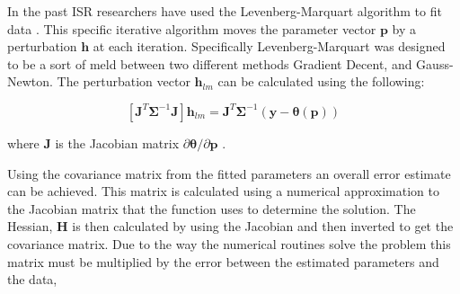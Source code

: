 \documentclass[draft,ras]{agutex}
\begin{document}
\begin{article}
%
%






In the past ISR researchers have used the Levenberg-Marquart algorithm to fit data \citep{nikoukar2008}.  This specific iterative algorithm moves the parameter vector $\mathbf{p}$ by a perturbation $\mathbf{h}$ at each iteration\citep{gavin:2013}.  Specifically Levenberg-Marquart was designed to be a sort of meld between two different methods Gradient Decent, and Gauss-Newton.  The perturbation vector $\mathbf{h}_{lm}$ can be calculated using the following:

\begin{equation}
\left[ \mathbf{J}^T\bm{\Sigma}^{-1}\mathbf{J}\right]\mathbf{h}_{lm} =\mathbf{J}^T\bm{\Sigma}^{-1}(\mathbf{y}-\bm{\theta}(\mathbf{p}))
\label{hlm}
\end{equation}

\noindent where $\mathbf{J}$ is the Jacobian matrix $\partial \bm{\theta}/\partial \mathbf{p}$ \citep{levenberg1944,marquardt:1963}. 

Using the covariance matrix from the fitted parameters an overall error estimate can be achieved. This matrix is calculated using a numerical approximation to the Jacobian matrix that the function uses to determine the solution. The Hessian, $\mathbf{H}$ is then calculated by using the Jacobian and then inverted to get the covariance matrix. Due to the way the numerical routines solve the problem this matrix must be multiplied by the error between the estimated parameters and the data,


\end{article}
\end{document}
